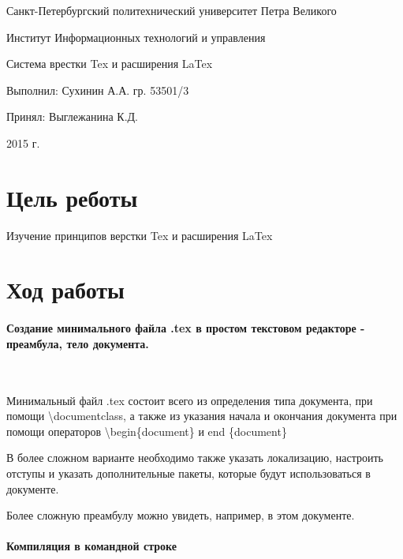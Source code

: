 \documentclass{article}
\begin{document}
\begin{titlepage} \begin{center}

	\Large			
Санкт-Петербургский политехнический университет Петра Великого
			
	\vspace{0.2cm}	
Институт Информационных технологий и управления
		
	\vspace{2cm} \vfill \huge
Система врестки Tex и расширения LaTex		
		
	\vfill 
	\begin{flushleft} \large \hangindent=8cm 
Выполнил: Сухинин А.А. гр. 53501/3 \hrulefill
			
Принял: Выглежанина К.Д. \hrulefill
	\end{flushleft}
		
	\vspace{2cm} \vfill \LARGE
2015 г.
		
\end{center} \end{titlepage}


\section{Цель реботы} \label{Goal}
Изучение принципов верстки Tex и расширения LaTex

\section{Ход работы} \label{main}
\paragraph{Создание минимального файла .tex в простом текстовом редакторе - преамбула, тело документа.}

~

Минимальный файл .tex состоит всего из определения типа документа, при помощи \textbackslash documentclass, а также из указания начала и окончания документа при помощи операторов \textbackslash begin\{document\} и end \{document\}

В более сложном варианте необходимо также указать локализацию, настроить отступы и указать дополнительные пакеты, которые будут использоваться в документе.

Более сложную преамбулу можно увидеть, например, в этом документе.

\paragraph{Компиляция в командной строке} 
~
\end{document}
